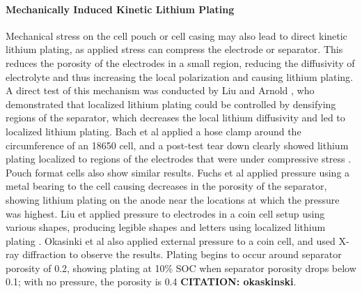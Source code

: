 \documentclass{article}
\begin{document}
\paragraph{Mechanically Induced Kinetic Lithium Plating}
Mechanical stress on the cell pouch or cell casing may also lead to direct kinetic lithium plating, as applied stress can compress the electrode or separator. This reduces the porosity of the electrodes in a small region, reducing the diffusivity of electrolyte and thus increasing the local polarization and causing lithium plating. A direct test of this mechanism was conducted by Liu and Arnold \cite{liu_effects_2020}, who demonstrated that localized lithium plating could be controlled by densifying regions of the separator, which decreases the local lithium diffusivity and led to localized lithium plating. Bach et al applied a hose clamp around the circumference of an 18650 cell, and a post-test tear down clearly showed lithium plating localized to regions of the electrodes that were under compressive stress \cite{bach_nonlinear_2016}. Pouch format cells also show similar results. Fuchs et al applied pressure using a metal bearing to the cell causing decreases in the porosity of the separator, showing lithium plating on the anode near the locations at which the pressure was highest\cite{fuchs_post-mortem_2019}. Liu et applied pressure to electrodes in a coin cell setup using various shapes, producing legible shapes and letters using localized lithium plating \cite{liu_size_2018}. Okasinki et al also applied external pressure to a coin cell, and used X-ray diffraction to observe the results. Plating begins to occur around separator porosity of 0.2, showing plating at 10\% SOC when separator porosity drops below 0.1; with no pressure, the porosity is 0.4 \textbf{CITATION: okaskinski}.
\end{document}
